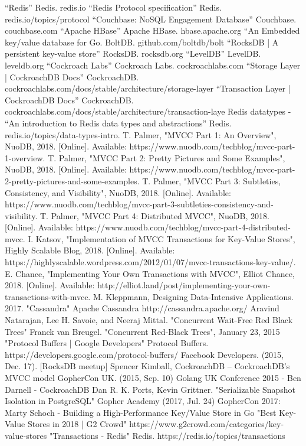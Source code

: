 \documentclass[conference]{IEEEtran}
\begin{document}
    \begin{thebibliography}{00}
     “Redis” Redis. redis.io
     “Redis Protocol specification” Redis. redis.io/topics/protocol
     “Couchbase: NoSQL Engagement Database” Couchbase. couchbase.com
     “Apache HBase” Apache HBase. hbase.apache.org
     “An Embedded key/value database for Go. BoltDB. github.com/boltdb/bolt
     “RocksDB | A persistent key-value store” RocksDB. rocksdb.org
     “LevelDB” LevelDB. leveldb.org
     “Cockroach Labs” Cockroach Labs. cockroachlabs.com
     “Storage Layer | CockroachDB Docs” CockroachDB. cockroachlabs.com/docs/stable/architecture/storage-layer
     “Transaction Layer | CockroachDB Docs” CockroachDB. cockroachlabs.com/docs/stable/architecture/transaction-laye
     Redis datatypes - “An introduction to Redis data types and abstractions” Redis. redis.io/topics/data-types-intro.
     T. Palmer, "MVCC Part 1: An Overview", NuoDB, 2018. [Online]. Available: https://www.nuodb.com/techblog/mvcc-part-1-overview.
     T. Palmer, "MVCC Part 2: Pretty Pictures and Some Examples", NuoDB, 2018. [Online]. Available: https://www.nuodb.com/techblog/mvcc-part-2-pretty-pictures-and-some-examples.
     T. Palmer, "MVCC Part 3: Subtleties, Consistency, and Visibility", NuoDB, 2018. [Online]. Available: https://www.nuodb.com/techblog/mvcc-part-3-subtleties-consistency-and-visibility.
     T. Palmer, "MVCC Part 4: Distributed MVCC", NuoDB, 2018. [Online]. Available: https://www.nuodb.com/techblog/mvcc-part-4-distributed-mvcc.
     I. Katsov, "Implementation of MVCC Transactions for Key-Value Stores", Highly Scalable Blog, 2018. [Online]. Available: https://highlyscalable.wordpress.com/2012/01/07/mvcc-transactions-key-value/.
     E. Chance, "Implementing Your Own Transactions with MVCC", Elliot Chance, 2018. [Online]. Available: http://elliot.land/post/implementing-your-own-transactions-with-mvcc.
     M. Kleppmann, Designing Data-Intensive Applications. 2017.
     "Cassandra" Apache Cassandra http://cassandra.apache.org/
     Aravind Natarajan, Lee H. Savoie, and Neeraj Mittal. "Concurrent Wait-Free Red Black Trees"
     Franck van Breugel. "Concurrent Red-Black Trees", January 23, 2015
     "Protocol Buffers | Google Developers" Protocol Buffers. https://developers.google.com/protocol-buffers/
     Facebook Developers. (2015, Dec. 17). [RocksDB meetup] Spencer Kimball, CockroachDB – CockroachDB's MVCC model 
     GopherCon UK. (2015, Sep. 10) Golang UK Conference 2015 - Ben Darnell - CockroachDB
     Dan R. K. Ports, Kevin Grittner. "Serializable Snapshot Isolation in PostgreSQL" 
     Gopher Academy (2017, Jul. 24) GopherCon 2017: Marty Schoch - Building a High-Performance Key/Value Store in Go
     "Best Key-Value Stores in 2018 | G2 Crowd" https://www.g2crowd.com/categories/key-value-stores
     "Transactions - Redis" Redis. https://redis.io/topics/transactions
    \end{thebibliography}
    
\end{document}

